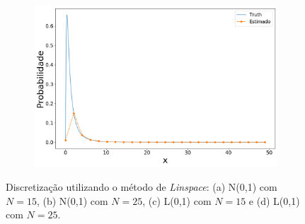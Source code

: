 \begin{figure}[ht]
\begin{subfigure}[b]{0.45\textwidth}
		\caption{}
		\label{fig:lin_log15}
	\end{subfigure}
	\hfill
	\begin{subfigure}[b]{0.45\textwidth}
		\centering 
		\includegraphics[width=\linewidth]{./figuras/Linspace_lognormal_25}
		\caption{}
		\label{fig:lin_log25}
	\end{subfigure}
	
	\caption{Discretização utilizando o método de \textit{Linspace}: (a) N(0,1) com $N = 15$, (b) N(0,1) com $N = 25$, (c) L(0,1) com $N = 15$ e (d) L(0,1) com $N = 25$.}
	\label{fig:normlin}
\end{figure}


